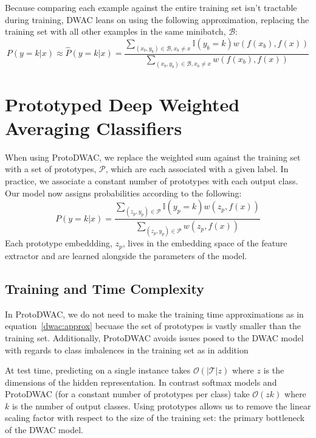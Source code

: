 \documentclass[11pt,letterpaper]{article}
\newcommand{\mc}{\mathcal}
\newcommand{\I}{\mathbb{I}}
\begin{document}
Because comparing each example against the entire training set isn't tractable during training, DWAC leans on using the following approximation, replacing the training set with all other
examples in the same minibatch, $\mc{B}$:
\begin{equation} \label{dwac:approx}
  P(y = k | x) \approx \widehat{P}(y = k | x) = \frac{\sum_{(x_b, y_b) \in \mc{B}, x_b \neq x} \I(y_b = k) w(f(x_b), f(x))}{\sum_{(x_b, y_b) \in \mc{B}, x_b \neq x} w(f(x_b), f(x))}
\end{equation}

\section{Prototyped Deep Weighted Averaging Classifiers}
When using ProtoDWAC, we replace the weighted sum against the training set with a set of prototypes, $\mc{P}$, which are each associated with a given label. In practice, we associate a
constant number of prototypes with each output class. Our model now assigns probabilities according to the following:
\begin{equation} \label{proto:probs}
  P(y = k | x) = \frac{\sum_{(z_p, y_p) \in \mc{P}} \I(y_p = k) w(z_p, f(x))}{\sum_{(z_p, y_p) \in \mc{P}} w(z_p, f(x))}
\end{equation}
Each prototype embeddding, $z_p$, lives in the embedding space of the feature extractor and are learned alongside the parameters of the model.

\subsection{Training and Time Complexity}
In ProtoDWAC, we do not need to make the training time approximations as in equation~\ref{dwac:approx} becuase the set of prototypes is vastly smaller than the training set. Additionally, ProtoDWAC avoids issues posed to the DWAC model with regards to class imbalences in the training set as in addition

At test time, predicting on a single instance takes $\mc{O}(|\mc{T}|z)$ where $z$ is the dimensions of the hidden representation. In contrast softmax models and ProtoDWAC (for a constant number of prototypes per class) take $\mc{O}(zk)$ where $k$ is the number of output classes. Using prototypes allows us to remove the linear scaling factor with respect to the size of the training set: the primary bottleneck of the DWAC model.
\end{document}
